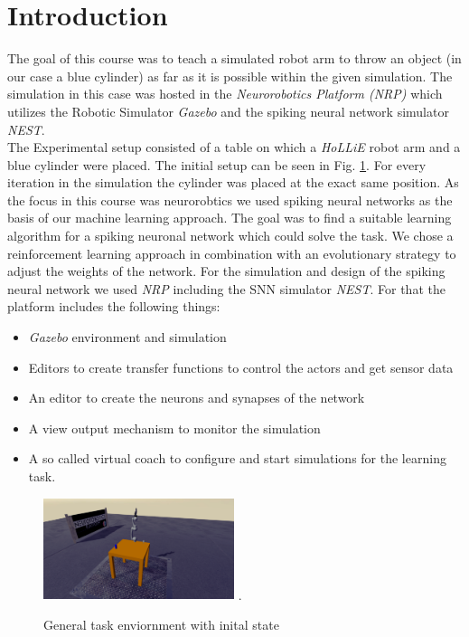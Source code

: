 \section{Introduction}
The goal of this course was to teach a simulated robot arm to throw an object (in our case a blue cylinder) as far as it is possible within the given simulation. The simulation in this case was hosted 
in the \textit{Neurorobotics Platform (NRP)} which utilizes the Robotic Simulator \textit{Gazebo} and the spiking neural network simulator \textit{NEST}.\\%
The Experimental setup consisted of a table on which a \textit{HoLLiE} robot arm and a blue cylinder were placed.
The initial setup can be seen in Fig. \ref{init_state}. For every iteration in the simulation the cylinder was placed at the exact same position. 
As the focus in this course was neurorobtics we used spiking neural networks as the basis of our machine learning approach.  
The goal was to find a suitable learning algorithm for a spiking neuronal network which could solve the task. We chose a reinforcement learning approach in combination with an evolutionary strategy to adjust the weights of the network.
For the simulation and design of the spiking neural network we used \textit{NRP} including the SNN simulator \textit{NEST}. For that the platform includes the following things:
 \begin{itemize}
\item \textit{Gazebo} environment and simulation
\item Editors to create transfer functions to control the actors and get sensor data
\item An editor to create the neurons and synapses of the network
\item A view output mechanism to monitor the simulation
\item A so called virtual coach to configure and start simulations for the learning task.
\end{itemize} 
\begin{figure}[H]
	\centering
	\includegraphics[width=2.2in]{img/init_state.png}
	\DeclareGraphicsExtensions.
	\caption{General task enviornment with inital state }
	\label{init_state}
\end{figure}

